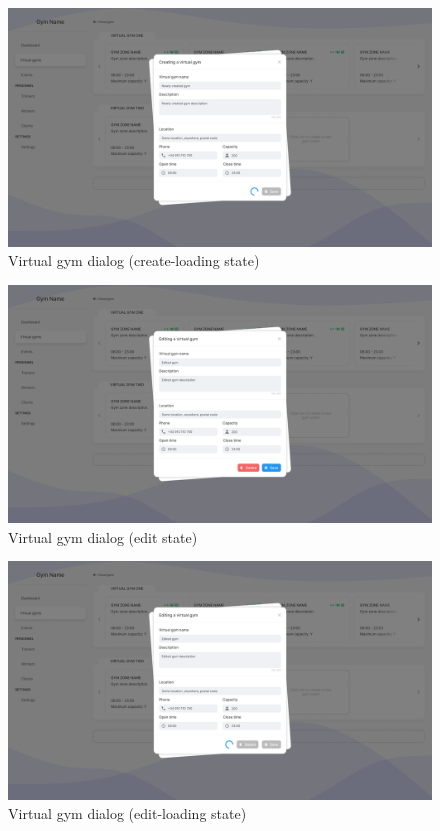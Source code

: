 \documentclass[a4paper, 12pt, oneside]{book}
\begin{document}
\begin{figure}[H]
	\centering
	\includegraphics[width=\textwidth]{assets/ui/CreateLoadingVirtualGym.png}
	\caption{Virtual gym dialog (create-loading state)}
\end{figure}
\begin{figure}[H]
	\centering
	\includegraphics[width=\textwidth]{assets/ui/EditVirtualGym.png}
	\caption{Virtual gym dialog (edit state)}
\end{figure}
\begin{figure}[H]
	\centering
	\includegraphics[width=\textwidth]{assets/ui/EditLoadingVirtualGym.png}
	\caption{Virtual gym dialog (edit-loading state)}
\end{figure}
\end{document}
